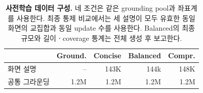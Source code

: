 \begin{table}[t]
\centering
\scriptsize
\setlength{\tabcolsep}{3.2pt}
\begin{tabular}{lrrrr}
\toprule
 & Ground. & Concise & Balanced & Compr. \\
\midrule
화면 설명 & -- & 143K & 144k & 148K \\
공통 그라운딩 & 1.2M & 1.2M & 1.2M & 1.2M \\
\bottomrule
\end{tabular}
\caption{\textbf{사전학습 데이터 구성.} 네 조건은 같은 grounding
pool과 좌표계를 사용한다. 최종 통제 비교에서는 세 설명이 모두
유효한 동일 화면의 교집합과 동일 update 수를 사용한다. Balanced의
최종 규모와 길이ㆍcoverage 통계는 전체 생성 후 보고한다.}
\label{tab:data}
\end{table}
